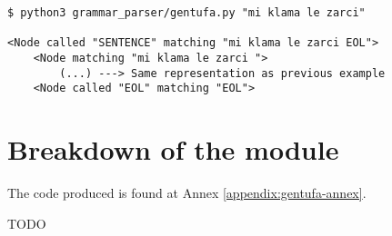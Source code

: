 \newpage

\begin{lstlisting}[caption=Gentufa module being used as a command-line interface tool]
$ python3 grammar_parser/gentufa.py "mi klama le zarci"

<Node called "SENTENCE" matching "mi klama le zarci EOL">
    <Node matching "mi klama le zarci ">
        (...) ---> Same representation as previous example
    <Node called "EOL" matching "EOL">
\end{lstlisting}

\section{Breakdown of the module}
\label{sec:parsing_lojban_sentences}

The code produced is found at Annex \ref{appendix:gentufa-annex}.

TODO